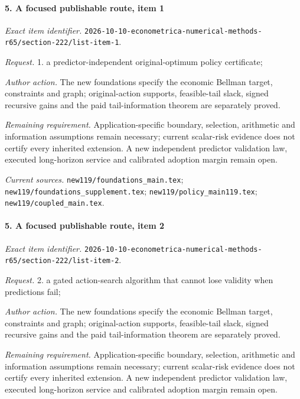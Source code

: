 \paragraph{5. A focused publishable route, item 1}

\emph{Exact item identifier.} \nolinkurl{2026-10-10-econometrica-numerical-methods-r65/section-222/list-item-1}.

\par\emph{Request.} 1. a predictor-independent original-optimum policy certificate;

\par\emph{Author action.} The new foundations specify the economic Bellman target, constraints and graph; original-action supports, feasible-tail slack, signed recursive gains and the paid tail-information theorem are separately proved.

\par\emph{Remaining requirement.} Application-specific boundary, selection, arithmetic and information assumptions remain necessary; current scalar-risk evidence does not certify every inherited extension. A new independent predictor validation law, executed long-horizon service and calibrated adoption margin remain open.

\par\emph{Current sources.} \nolinkurl{new119/foundations_main.tex}; \nolinkurl{new119/foundations_supplement.tex}; \nolinkurl{new119/policy_main119.tex}; \nolinkurl{new119/coupled_main.tex}.

\paragraph{5. A focused publishable route, item 2}

\emph{Exact item identifier.} \nolinkurl{2026-10-10-econometrica-numerical-methods-r65/section-222/list-item-2}.

\par\emph{Request.} 2. a gated action-search algorithm that cannot lose validity when predictions fail;

\par\emph{Author action.} The new foundations specify the economic Bellman target, constraints and graph; original-action supports, feasible-tail slack, signed recursive gains and the paid tail-information theorem are separately proved.

\par\emph{Remaining requirement.} Application-specific boundary, selection, arithmetic and information assumptions remain necessary; current scalar-risk evidence does not certify every inherited extension. A new independent predictor validation law, executed long-horizon service and calibrated adoption margin remain open.

